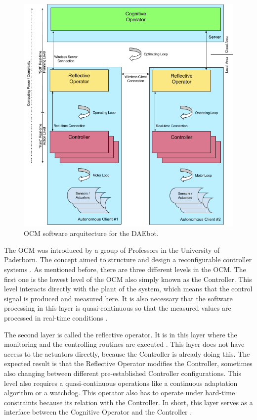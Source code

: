 \documentclass[12pt]{report}%
\begin{document}
\begin{figure}[h!t]
	\centering
	\includegraphics[width=\textwidth]{ocm}
    \caption{OCM software arquitecture for the DAEbot\cite{Wiki}.}
    \label{fig:ocm}
\end{figure}
\clearpage

The OCM was introduced by a group of Professors in the University of Paderborn. The concept aimed to structure and design a reconfigurable controller systems \cite{ocmAuto}. As mentioned before, there are three different levels in the OCM. The first one is the lowest level of the OCM also simply known as the Controller. This level interacts directly with the plant of the system, which means that the control signal is produced and measured here. It is also necessary that the software processing in this layer is quasi-continuous so that the measured values are processed in real-time conditions \cite{ocmAuto}.

The second layer is called the reflective operator. It is in this layer where the monitoring and the controlling routines are executed \cite{ocmAuto}. This layer does not have access to the actuators directly, because the Controller is already doing this. The expected result is that the Reflective Operator modifies the Controller, sometimes also changing between different pre-established Controller configurations. This level also requires a quasi-continuous operations like a continuous adaptation algorithm or a watchdog. This operator also has to operate under hard-time constraints because its relation with the Controller. In short, this layer serves as a interface between the Cognitive Operator and the Controller \cite{ocmAuto}.
\end{document}
